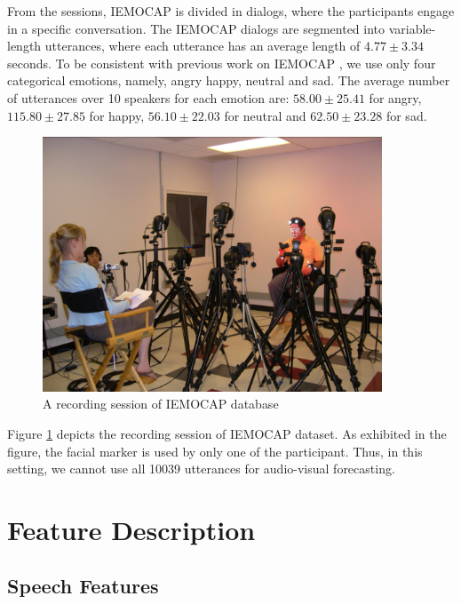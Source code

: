 From the sessions, IEMOCAP is divided in dialogs, where the participants engage in a specific conversation. The IEMOCAP dialogs are segmented into variable-length utterances, where each utterance has an average length of $4.77\pm3.34$ seconds. To be consistent with previous work on IEMOCAP \cite{Meta, Kim2016EmotionSD}, we use only four categorical emotions, namely, angry happy, neutral and sad. The average number of utterances over 10 speakers for each emotion are: $58.00\pm25.41$ for angry, $115.80\pm27.85$ for happy, $56.10\pm22.03$ for neutral and $62.50\pm23.28$ for sad.

\begin{figure}
\centering
   \includegraphics[width=0.9\textwidth]{Chapters/IEMOCAP_record.png}
\caption[IEMOCAP recording]{A recording session of IEMOCAP database}
\label{fig:data_recording}
\end{figure}

Figure \ref{fig:data_recording} depicts the recording session of IEMOCAP dataset. As exhibited in the figure, the facial marker is used by only one of the participant. Thus, in this setting, we cannot use all 10039 utterances for audio-visual forecasting.  

\chapter{Feature Description} %
\label{Chapter2} %
\section{Speech Features}

